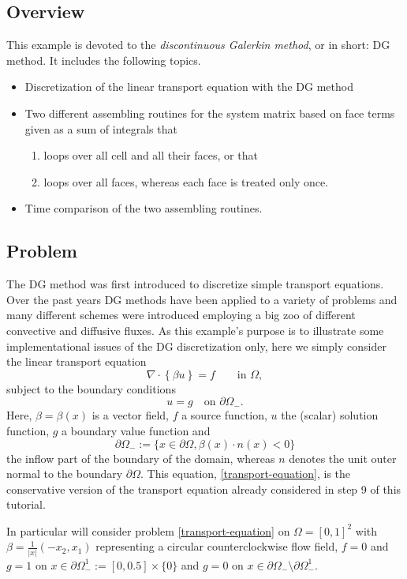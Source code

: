 \documentclass[11pt]{article}
\begin{document}
\subsection{Overview}
This example is devoted to the \emph{discontinuous Galerkin method}, or
in short: DG method. It includes the following topics.
\begin{itemize}
\item Discretization of the linear transport equation with the DG method
\item Two different assembling routines for the system matrix based on
  face terms given as a sum of integrals that
\begin{enumerate}
\item loops over all cell and all their faces, or that
\item loops over all faces, whereas each face is treated only once.
\end{enumerate}
\item Time comparison of the two assembling routines.
\end{itemize}

\subsection{Problem}
The DG method was first introduced to discretize simple transport
equations. Over the past years DG methods have been applied to a
variety of problems and many different schemes were introduced
employing a big zoo of different convective and diffusive fluxes.  As
this example's purpose is to illustrate some implementational issues
of the DG discretization only, here we simply consider the linear
transport equation
\begin{equation}\label{transport-equation}
  \nabla\cdot \left\{\beta u\right\}=f  \qquad\mbox{in }\Omega,
\end{equation}
subject to the boundary conditions
\[
u=g\quad\mbox{on }\partial\Omega_-.
\]
Here, $\beta=\beta(x)$ is a vector field, $f$ a source function, $u$ the
(scalar) solution function, $g$ a boundary value function and
\[
\partial\Omega_-:=\{x\in\partial\Omega, \beta(x)\cdot n(x)<0\}
\]
the inflow part of the boundary of the domain, whereas $n$ denotes the
unit outer normal to the boundary $\partial\Omega$. This
equation, \eqref{transport-equation}, is the conservative version of
the transport equation already considered in step 9 of this tutorial.

In particular will consider problem \eqref{transport-equation} on
$\Omega=[0,1]^2$ with $\beta=\frac{1}{|x|}(-x_2, x_1)$ representing a
circular counterclockwise flow field, $f=0$ and $g=1$ on
$x\in\partial\Omega_-^1:=[0,0.5]\times\{0\}$ and $g=0$ on $x\in
\partial\Omega_-\setminus \partial\Omega_-^1$.
\end{document}
